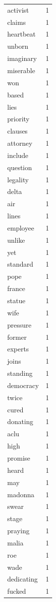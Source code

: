 \begin{tabular}{lr}
activist & 1 \\
claims & 1 \\
heartbeat & 1 \\
unborn & 1 \\
imaginary & 1 \\
miserable & 1 \\
won & 1 \\
based & 1 \\
lies & 1 \\
priority & 1 \\
clauses & 1 \\
attorney & 1 \\
include & 1 \\
question & 1 \\
legality & 1 \\
delta & 1 \\
air & 1 \\
lines & 1 \\
employee & 1 \\
unlike & 1 \\
yet & 1 \\
standard & 1 \\
pope & 1 \\
france & 1 \\
statue & 1 \\
wife & 1 \\
pressure & 1 \\
former & 1 \\
experts & 1 \\
joins & 1 \\
standing & 1 \\
democracy & 1 \\
twice & 1 \\
cured & 1 \\
donating & 1 \\
aclu & 1 \\
high & 1 \\
promise & 1 \\
heard & 1 \\
may & 1 \\
madonna & 1 \\
swear & 1 \\
stage & 1 \\
praying & 1 \\
malia & 1 \\
roe & 1 \\
wade & 1 \\
dedicating & 1 \\
fucked & 1 \\

\end{tabular}
